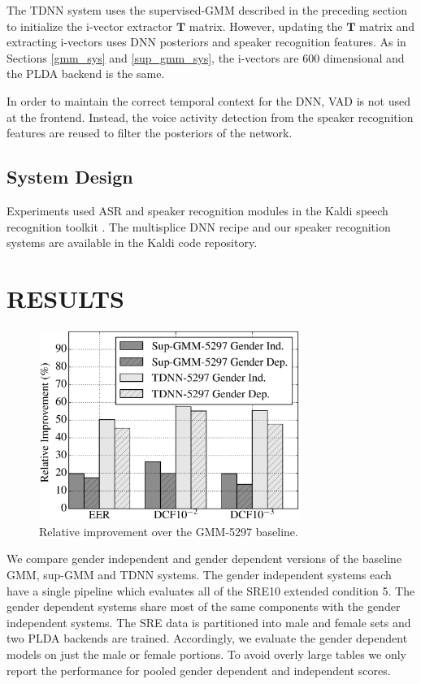 \documentclass{article}
\begin{document}
The TDNN system uses the supervised-GMM described in the preceding 
section to initialize the i-vector extractor $\boldsymbol{T}$ matrix.
However, updating the $\boldsymbol{T}$ matrix and extracting 
i-vectors uses DNN posteriors and 
speaker recognition features. As in Sections \ref{gmm_sys} and \ref{sup_gmm_sys},
 the i-vectors are 600 dimensional and the PLDA backend is the same.

In order to maintain the correct temporal context for the DNN, VAD
is not used at the frontend. Instead, the voice activity detection from the speaker recognition
features are reused to filter the posteriors of the network.

\subsection{System Design}
Experiments used ASR and speaker recognition modules in the
Kaldi speech recognition toolkit \cite{kaldi}. The multisplice
DNN recipe and our speaker recognition systems are available in
the Kaldi code repository.

\section{RESULTS}

\begin{figure}[th]
\centerline{\includegraphics[width=8.5cm]{fig/rel}}
\caption{Relative improvement over
              the GMM-5297 baseline.}
\label{fig:rel}
\end{figure}


We compare gender independent and gender dependent versions of the
baseline GMM, sup-GMM and TDNN systems. The gender independent
systems each have a single pipeline which evaluates all of the SRE10
extended condition 5. The gender dependent systems share most of the
same components with the gender independent systems. 
The SRE data is partitioned into male and female sets and two PLDA
backends are trained. Accordingly, we evaluate the gender
dependent models on just the male or female portions. To avoid 
overly large
tables we only report the performance for pooled gender dependent
and independent scores.
\end{document}
